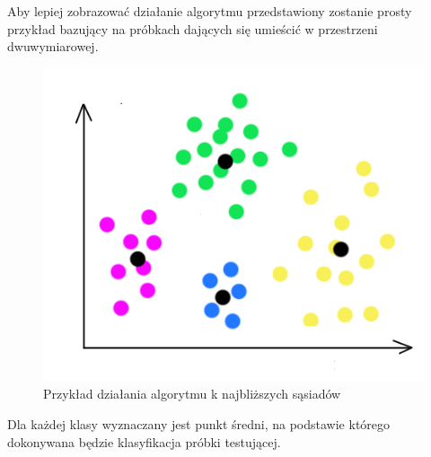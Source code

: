 \documentclass[12pt]{article}
\begin{document}
Aby lepiej zobrazować działanie algorytmu przedstawiony zostanie prosty przykład bazujący na próbkach dających się umieścić w przestrzeni dwuwymiarowej. \newline
\begin{figure}[H]
	\centering
		\includegraphics[scale=0.7]{images/nm_alg_example.png}
	\caption{Przykład działania algorytmu k najbliższych sąsiadów \cite{bib1}}
\end{figure}

 
\indent Dla każdej klasy wyznaczany jest punkt średni, na podstawie którego dokonywana będzie klasyfikacja próbki testującej. 
\end{document}
